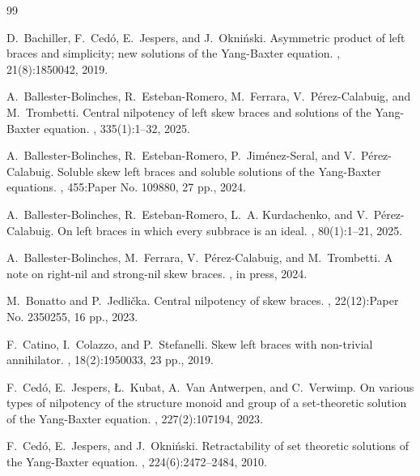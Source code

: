 \documentclass[12pt, a4paper, english]{article}
\theoremstyle{definition}
\begin{document}
\begin{thebibliography}{99}

D.~Bachiller, F.~Ced{\'o}, E.~Jespers, and J.~Okni{\'n}ski.
\newblock Asymmetric product of left braces and simplicity; new solutions of
  the {Y}ang-{B}axter equation.
, 21(8):1850042, 2019.

A.~Ballester-Bolinches, R.~Esteban-Romero, M.~Ferrara, V.~P{\'e}rez-Calabuig,
  and M.~Trombetti.
\newblock Central nilpotency of left skew braces and solutions of the
  {Y}ang-{B}axter equation.
, 335(1):1--32, 2025.

A.~Ballester-Bolinches, R.~Esteban-Romero, P.~Jim{\'e}nez-Seral, and
  V.~P{\'e}rez-Calabuig.
\newblock Soluble skew left braces and soluble solutions of the {Y}ang-{B}axter
  equations.
, 455:Paper No. 109880, 27 pp., 2024.

A.~Ballester-Bolinches, R.~Esteban-Romero, L.~A. Kurdachenko, and
  V.~Pérez-Calabuig.
\newblock On left braces in which every subbrace is an ideal.
, 80(1):1--21, 2025.


A.~Ballester-Bolinches, M.~Ferrara, V.~Pérez-Calabuig, and M.~Trombetti.
\newblock A note on right-nil and strong-nil skew braces.
, in press, 2024.

M.~Bonatto and P.~Jedli\v{c}ka.
\newblock Central nilpotency of skew braces.
, 22(12):Paper No. 2350255, 16 pp., 2023.

F.~Catino, I.~Colazzo, and P.~Stefanelli.
\newblock Skew left braces with non-trivial annihilator.
, 18(2):1950033, 23 pp., 2019.

F.~Ced{\'o}, E.~Jespers, {\L}.~Kubat, A.~Van Antwerpen, and C.~Verwimp.
\newblock On various types of nilpotency of the structure monoid and group of a
  set-theoretic solution of the {Y}ang-{B}axter equation.
, 227(2):107194, 2023.

F.~Ced{\'o}, E.~Jespers, and J.~Okni{\'n}ski.
\newblock Retractability of set theoretic solutions of the {Y}ang-{B}axter
  equation.
, 224(6):2472--2484, 2010.


\end{thebibliography}
\end{document}
